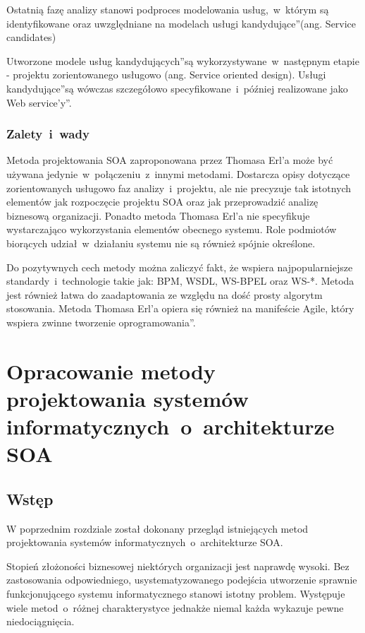 Ostatnią fazę analizy stanowi podproces modelowania usług,~w~którym są identyfikowane oraz uwzględniane na modelach \quotedblbase usługi kandydujące\textquotedblright (ang. Service candidates) \cite{CompSOAMet}

Utworzone modele \quotedblbase usług kandydujących\textquotedblright są wykorzystywane~w~następnym etapie - projektu zorientowanego usługowo (ang. Service oriented design). \quotedblbase Usługi kandydujące\textquotedblright są wówczas szczegółowo specyfikowane~i~później realizowane jako \quotedblbase Web service'y\textquotedblright.


\subsection{Zalety~i~wady}
Metoda projektowania SOA zaproponowana przez Thomasa Erl'a może być używana jedynie~w~połączeniu~z~innymi metodami. Dostarcza opisy dotyczące zorientowanych usługowo faz analizy~i~projektu, ale nie precyzuje tak istotnych elementów jak rozpoczęcie projektu SOA oraz jak przeprowadzić analizę biznesową organizacji. Ponadto metoda Thomasa Erl'a nie specyfikuje wystarczająco wykorzystania elementów obecnego systemu. Role podmiotów biorących udział~w~działaniu systemu nie są również spójnie określone.

Do pozytywnych cech metody można zaliczyć fakt, że wspiera najpopularniejsze standardy~i~technologie takie jak: BPM, WSDL, WS-BPEL oraz WS-*. Metoda jest również łatwa do zaadaptowania ze względu na dość prosty algorytm stosowania. Metoda Thomasa Erl'a opiera się również na manifeście Agile, który wspiera \quotedblbase zwinne tworzenie oprogramowania\textquotedblright \cite{OffCompSOAM, RamErvSOA}.

\chapter{Opracowanie metody projektowania systemów informatycznych~o~architekturze SOA}
\section{Wstęp}
W poprzednim rozdziale został dokonany przegląd istniejących metod projektowania systemów informatycznych~o~architekturze SOA.

Stopień złożoności biznesowej niektórych organizacji jest naprawdę wysoki. Bez zastosowania odpowiedniego, usystematyzowanego podejścia utworzenie sprawnie funkcjonującego systemu informatycznego stanowi istotny problem. Występuje wiele metod~o~różnej charakterystyce jednakże niemal każda wykazuje pewne niedociągnięcia.

